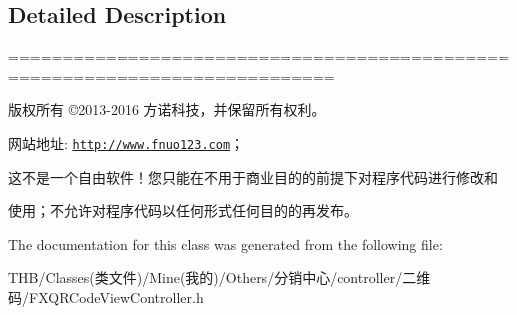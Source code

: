 \subsection{Detailed Description}
============================================================================

版权所有 ©2013-\/2016 方诺科技，并保留所有权利。

网站地址\+: \href{http://www.fnuo123.com}{\tt http\+://www.\+fnuo123.\+com}； 



这不是一个自由软件！您只能在不用于商业目的的前提下对程序代码进行修改和

使用；不允许对程序代码以任何形式任何目的的再发布。 

 

The documentation for this class was generated from the following file\+:\begin{DoxyCompactItemize}
\item 
T\+H\+B/\+Classes(类文件)/\+Mine(我的)/\+Others/分销中心/controller/二维码/F\+X\+Q\+R\+Code\+View\+Controller.\+h\end{DoxyCompactItemize}
